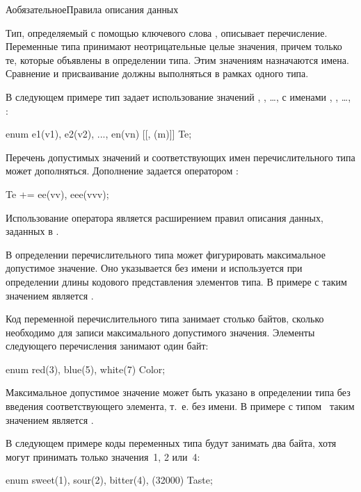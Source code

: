 \begin{appendix}{А}{обязательное}{Правила описания данных}
\label{SYNTAX.Enums}

Тип, определяемый с помощью ключевого слова , описывает 
перечисление. Переменные типа принимают неотрицательные целые значения, причем 
только те, которые объявлены в определении типа. Этим значениям назначаются 
имена. Сравнение и присваивание должны выполняться в рамках одного типа.

В следующем примере тип  задает использование значений 
, , \ldots,  с именами 
, , \ldots, :
\begin{codeblock}
enum {e1(v1), e2(v2), ..., en(vn) [[, (m)]]} Te;
\end{codeblock}

Перечень допустимых значений и соответствующих имен перечислительного типа 
может дополняться. Дополнение задается оператором \code{+=}:
\begin{codeblock}
Te += {ee(vv), eee(vvv)};
\end{codeblock}

\begin{note*}
Использование оператора \code{+=} является расширением правил описания данных, 
заданных в \cite{RFC8446}.
\end{note*}

В определении перечислительного типа может фигурировать максимальное допустимое 
значение. Оно указывается без имени и используется при определении длины 
кодового представления элементов типа. В примере с  таким значением 
является .

Код переменной перечислительного типа занимает столько байтов, сколько 
необходимо для записи максимального допустимого значения. Элементы следующего 
перечисления занимают один байт:
%
\begin{codeblock}
enum {red(3), blue(5), white(7)} Color;
\end{codeblock}

Максимальное допустимое значение может быть указано в определении типа без 
введения соответствующего элемента, т.~е. без имени. В примере с типом~ 
таким значением является . 

В следующем примере коды переменных типа  будут занимать два байта, 
хотя могут принимать только значения~1, 2 или~4: 
%
\begin{codeblock}
enum {sweet(1), sour(2), bitter(4), (32000)} Taste;
\end{codeblock}


\end{appendix}
